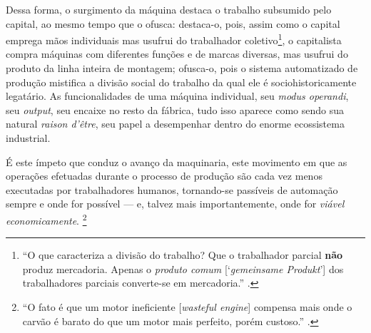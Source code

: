 Dessa forma, o surgimento da máquina destaca o trabalho subsumido pelo capital, ao mesmo tempo que o ofusca: destaca-o, pois, assim como o capital emprega mãos individuais mas usufrui do trabalhador coletivo\footnote{``O que caracteriza a divisão do trabalho? Que o trabalhador parcial \textbf{não} produz mercadoria. Apenas o \emph{produto comum} {[}`\emph{gemeinsame Produkt}'{]} dos trabalhadores parciais converte-se em mercadoria.'' \parencite[p. 429, grifo e adendo meus]{Marx2017}.}, o capitalista compra máquinas com diferentes funções e de marcas diversas, mas usufrui do produto da linha inteira de montagem; ofusca-o, pois o sistema automatizado de produção mistifica a divisão social do trabalho da qual ele é sociohistoricamente legatário. As funcionalidades de uma máquina individual, seu \emph{modus operandi}, seu \emph{output}, seu encaixe no resto da fábrica, tudo isso aparece como sendo sua natural \emph{raison d'être}, seu papel a desempenhar dentro do enorme ecossistema industrial. 

É este ímpeto que conduz o avanço da maquinaria, este movimento em que as operações efetuadas durante o processo de produção são cada vez menos executadas por trabalhadores humanos, tornando-se passíveis de automação sempre e onde for possível --- e, talvez mais importantemente, onde for \emph{viável economicamente}. \footnote{``O fato é que um motor ineficiente {[}\emph{wasteful engine}{]} compensa mais onde o carvão é barato do que um motor mais perfeito, porém custoso.'' \parencite[p. 6]{Jevons1866}.}

